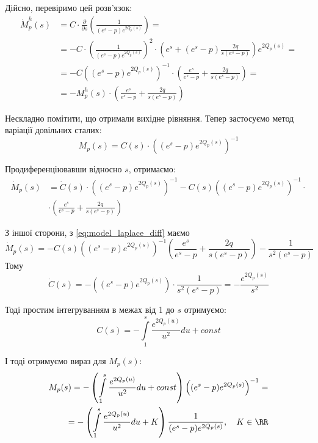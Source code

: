 Дійсно, перевіримо цей розв'язок:
\[
\begin{split}
\dot M_{p}^{h} (s) &= C \cdot \frac{\partial}{\partial s} \left(\frac{1}{(e^s - p)  e^{2Q_p(s)}}\right)=\\
&= - C \cdot \left(\frac{1}{(e^s - p)  e^{2Q_p(s)}}\right)^2 \cdot \left(e^s  + (e^s - p) \frac{2q}{s(e^s - p)}   \right) e^{2Q_p(s)} =\\
&= -C \left((e^s - p)  e^{2Q_p(s)}\right)^{-1} \cdot \left(\frac{e^s}{e^s - p}  + \frac{2q}{s(e^s - p)}   \right) =\\
&= - M_{p}^{h}(s) \cdot \left(\frac{e^s}{e^s - p}  + \frac{2q}{s(e^s - p)}   \right)
\end{split}
\]

Нескладно помітити, що отримали вихідне рівняння. Тепер застосуємо метод варіації довільних сталих:
$$
M_{p}(s) = C(s) \cdot \left((e^s - p)  e^{2Q_p(s)}\right)^{-1} 
$$

Продиференціювавши відносно $s$, отримаємо:
\begin{align*}
\dot M_{p}(s) &= \dot C(s) \cdot \left((e^s - p)  e^{2Q_p(s)}\right)^{-1} -C(s) \left((e^s - p)  e^{2Q_p(s)}\right)^{-1} \cdot \\
&\cdot \left(\frac{e^s}{e^s - p}  + \frac{2q}{s(e^s - p)}   \right) 
\end{align*}

З іншої сторони, з \eqref{eq:model_laplace_diff} маємо
$$
\dot M_{p}(s) = - C(s) \left((e^s - p)  e^{2Q_p(s)}\right)^{-1}  \left(\frac{e^s}{e^s - p} + \frac{2q}{s(e^s - p)}\right) - \frac{1}{s^2(e^s - p)} \quad	
$$
Тому
$$
\dot C(s) = - \left((e^s - p)  e^{2Q_p(s)}\right) \cdot  \frac{1}{s^2(e^s - p)} =  - \frac{e^{2Q_p(s)}}{s^2}
$$

Тоді простим інтегруванням в межах від 1 до $s$ отримуємо:
\begin{equation}
C(s) = -  \int\limits_1^s \frac{e^{2Q_p(u)}}{u^2} du + const
\end{equation}

І тоді отримуємо вираз для $M_{p}(s)$:
\begin{equation}
\begin{split}
M_{p}(s)=- \left( \int\limits_1^s \frac{e^{2Q_p(u)}}{u^2} du + const \right) \left((e^s - p)  e^{2Q_p(s)}\right)^{-1}  =\\
= - \left( \int\limits_1^s \frac{e^{2Q_p(u)}}{u^2} du + K \right) \frac{1}{(e^s - p)  e^{2Q_p(s)}}, \quad K \in \RR
\end{split}
\end{equation}

